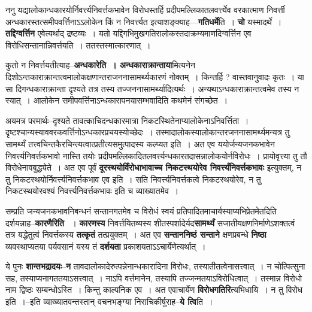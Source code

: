 \documentclass[article,12pt,a4paper]{memoir}
\begin{document}
	  \pstart ननु यद्यालोकान्धकारयोर्निवर्त्त्यनिवर्त्तकभावेन विरोधस्तर्हि प्रदीपमल्लिकातलवर्त्त्येव वरकात्माण निवर्त्ती अन्धकारस्तत्समीपवर्त्तिनाऽऽलोकेन किं न निवर्त्त्यत इत्याशङ्क्याह—\textbf{गतिधर्मे}ति । \textbf{चो} यस्मादर्थे । \textbf{तद्दिग्वर्त्तिन} एवेत्यर्थाद् द्रष्टव्यः । यतो यद्दिगभिमुखगतिरालोकस्तदाक्रम्यमाणदिग्वर्त्तिन एव विरोधिसन्तानान्निवर्त्तयति । ततस्तस्मात्कारणात् ।
	\pend
      

	  \pstart कुतो न निवर्त्तयतीत्याह--\textbf{अन्धकारेति । अन्धकाराक्रान्ताया}मित्यनेन दिशोऽन्तकाराक्रान्तत्वमालोकक्षणान्तराजननासामर्थ्यकारणं नोक्तम् । किन्तर्हि ? वास्तवानुवादः कृतः । या सा दिगन्धकाराक्रान्ता दृश्यते तत्र तस्य तज्जननासामर्थ्यादित्यर्थः । अन्यथाऽन्धकाराक्रान्तत्वमेव तस्य न स्यात् । आलोकेन समीपवर्त्तिनाऽन्धकारापनयासम्भवादिति कथमेनं संगच्छेत ।
	\pend
      

	  \pstart अयमत्र परमार्थः--दृश्यते तावत्काचिदन्धकारमात्रा निकटस्थितेनाप्यालोकेनाऽनिवर्त्तिता । दृष्टश्चान्यस्याववरकवर्त्तिनोऽन्धकारप्रचयस्योच्छेदः । तस्मादालोकस्यालोकान्तरजननासामर्थ्यमन्यत्र तु सामर्थ्यं तत्त्वचिन्तकैरचिन्त्यत्वात्प्रतीत्यसमुत्पादस्य कल्प्यत इति । अत एव ययोर्जन्यजनकभावेन निवर्त्त्यनिवर्त्तकभावो नास्ति तयोः प्रदीपमल्लिकादितलवर्त्त्यन्धकारतदासन्नालोकयोर्नविरोधः । प्रायोवृत्त्या तु तौ विरोधेनावबुद्ध्येते । अत एव पूर्वं \textbf{दूरस्थयोर्विंरोधाभावाच्च निकटस्थयोरेव निवर्त्त्यंनिवर्त्तकभावः\textbf{}} इत्युक्तम्, न तु निकटस्थयोर्निवर्त्त्यनिवर्त्तकभाव एव इति । सति निवर्त्त्यनिवर्त्तकत्वे निकटस्थयोरेव, न तु निकटस्थयोरवश्यं निवर्त्त्यनिवर्त्तकभावः इति च व्याख्यातमेव ।
	\pend
      

	  \pstart सम्प्रति जन्यजनकभावनिबन्धनं सन्तानगतमेव च विरोधं स्वयं प्रतिपादितमाचार्यस्याप्यभिप्रेतमेतदिति दर्शयन्नाह--\textbf{कारणैरिति}  । \textbf{कारणस्य} निवर्त्तयितव्यस्य शीतस्पर्शादेर्यद\textbf{सामर्थ्यं} सजातीयक्षणनिर्माणेऽशक्तत्वं तत्र यद्धेतुत्वं निवर्त्तकस्य \textbf{तत्कृतं} तत्प्रयुक्तम् । अत एव \textbf{सन्ताननिष्ठं सन्ताने} क्षणप्रबन्धे \textbf{निष्ठा} व्यवस्थाप्यतया पर्यवसानं यस्य तं \textbf{दर्शयता} प्रकाश\leavevmode{}यताऽऽचार्येणेत्यर्थात् ।
	\pend
      

	  \pstart ये पुनः \textbf{शान्तभद्रादयः}--\textbf{न} तावदालोकादेरुत्पन्नेनान्धकारादिना विरोधः, तस्यातीतत्वेनासत्त्वात् । न चोत्पित्सुना सह, तस्याप्यनागततयाऽसत्त्वात् । नाऽपि वर्त्तमानेन, तस्यापि तज्जन्मतयाऽविरोधित्वात् । तस्मान्न विरोधो नाम द्विष्ठः सम्बन्धोऽस्ति । किन्तु काल्पनिक एव । अत एवाचार्येण \textbf{विरोधगतिरि}त्यभिधायि । न तु विरोध इति ।--इति व्याख्यातवन्तस्तान् वचनभङ्ग्या निराचिकीर्षुराह--\textbf{ये त्वि}ति ।
	\pend
	  \bigskip
	  \begingroup
	
\end{document}

